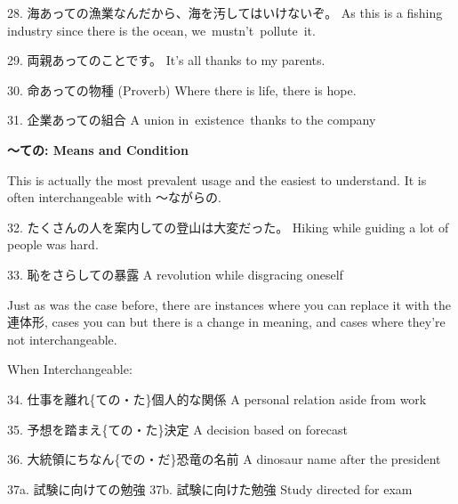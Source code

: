 \par{28. 海あっての漁業なんだから、海を汚してはいけないぞ。 \hfill\break
As this is a fishing industry since there is the ocean, we mustn't pollute it. }

\par{29. 両親あってのことです。 \hfill\break
It's all thanks to my parents. }

\par{30. 命あっての物種 (Proverb) \hfill\break
Where there is life, there is hope. }

\par{31. 企業あっての組合 \hfill\break
A union in existence thanks to the company }

\begin{center}
 \textbf{～ての: Means and Condition }
\end{center}

\par{ This is actually the most prevalent usage and the easiest to understand. It is often interchangeable with ～ながらの. }

\par{32. たくさんの人を案内しての登山は大変だった。 \hfill\break
Hiking while guiding a lot of people was hard. }

\par{33. 恥をさらしての暴露 \hfill\break
A revolution while disgracing oneself }

\par{ Just as was the case before, there are instances where you can replace it with the 連体形, cases you can but there is a change in meaning, and cases where they're not interchangeable. }

\par{When Interchangeable: }

\par{34. 仕事を離れ\{ての・た\}個人的な関係 \hfill\break
A personal relation aside from work }

\par{35. 予想を踏まえ\{ての・た\}決定 \hfill\break
A decision based on forecast }

\par{36. 大統領にちなん\{での・だ\}恐竜の名前 \hfill\break
A dinosaur name after the president }

\par{37a. 試験に向けての勉強 \hfill\break
37b. 試験に向けた勉強 \hfill\break
Study directed for exam  }
    